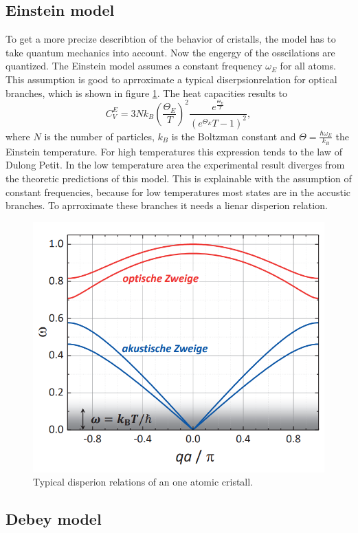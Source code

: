 \subsection{Einstein model}

To get a more precize describtion of the behavior of cristalls, the model has to take quantum mechanics into account. 
Now the engergy of the osscilations are quantized.
The Einstein model assumes a constant frequency $\omega_E$ for all atoms.
This assumption is good to aprroximate a typical diserpsionrelation for optical branches, which is shown in figure \ref{fig:disperion}. 
The heat capacities results to 
\begin{equation}
    C_V^E = 3 N k_B\left(\frac{\Theta_E}{T}\right)^2\frac{e^{\frac{\Theta_E}{T}}}{\left(e^{\Theta_E}{T}-1\right)^2},
\end{equation}
where $N$ is the number of particles, $k_B$ is the Boltzman constant and $\Theta=\frac{\hbar \omega_E}{k_B}$ the Einstein temperature.
For high temperatures this expression tends to the law of Dulong Petit.
In the low temperature area the experimental result diverges from the theoretic predictions of this model.
This is explainable with the assumption of constant frequencies, because for low temperatures most states are in the accustic branches.
To aprroximate these branches it needs a lienar disperion relation.

\begin{figure}
    \centering 
    \includegraphics[width=.8\textwidth]{Bilder/disperion.PNG}
    \caption{Typical disperion relations of an one atomic cristall.}
    \label{fig:disperion}
\end{figure}


\subsection{Debey model}






